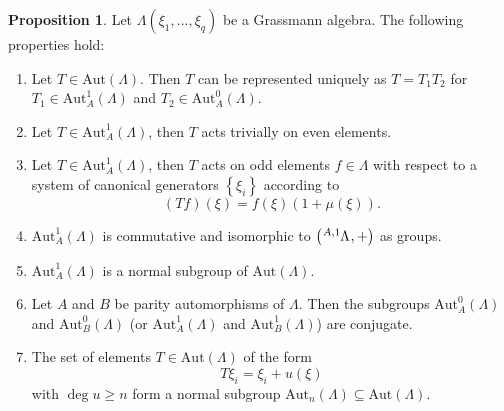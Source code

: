 \documentclass{article}
\theoremstyle{definition}
\newtheorem{proposition}{Proposition}
\begin{document}
\begin{proposition}
    Let $\Lambda(\xi_1, \dots, \xi_q)$ be a Grassmann algebra. The following properties hold:
    \begin{enumerate}
        \item Let $T \in \text{Aut}(\Lambda)$. Then $T$ can be represented uniquely as $T = T_1 T_2$ for $T_1 \in \text{Aut}_A^1(\Lambda)$ and $T_2 \in \text{Aut}_A^0(\Lambda)$.
        \item Let $T \in \text{Aut}_A^1(\Lambda)$, then $T$ acts trivially on even elements.
        \item Let $T \in \text{Aut}_A^1(\Lambda)$, then $T$ acts on odd elements $f \in \Lambda$ with respect to a system of canonical generators $\left\{ \xi_i \right\}$ according to
        \begin{equation*}
            (Tf)(\xi) = f(\xi)(1 + \mu(\xi)).
        \end{equation*}
        \item $\text{Aut}_A^1(\Lambda)$ is commutative and isomorphic to $\left( \tensor[^{A, 1}]{\Lambda}{}, + \right)$ as groups.
        \item $\text{Aut}_A^1(\Lambda)$ is a normal subgroup of $\text{Aut}(\Lambda)$.
        \item Let $A$ and $B$ be parity automorphisms of $\Lambda$. Then the subgroups $\text{Aut}_A^0(\Lambda)$ and $\text{Aut}_B^0(\Lambda)$ (or $\text{Aut}_A^1(\Lambda)$ and $\text{Aut}_B^1(\Lambda)$) are conjugate.
        \item The set of elements $T \in \text{Aut}(\Lambda)$ of the form
        \begin{equation*}
            T \xi_i = \xi_i + u(\xi)
        \end{equation*}
        with $\deg u \geq n$ form a normal subgroup $\text{Aut}_n(\Lambda) \subseteq \text{Aut}(\Lambda)$.
    \end{enumerate}
\end{proposition}
\end{document}
